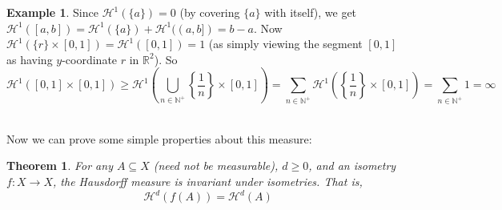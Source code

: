 \documentclass{article}
\theoremstyle{plain}
\newtheorem{thm}{Theorem}[section]
\theoremstyle{definition}
\newtheorem*{ex}{Example}
\theoremstyle{remark}
\begin{document}
\begin{ex}
    Since $\mathcal{H}^1(\{a\}) = 0$ (by covering $\{a\}$ with itself), we get $\mathcal{H}^1([a,b]) = \mathcal{H}^1(\{a\}) + \mathcal{H}^1((a,b])=b-a$. Now  $\mathcal{H}^1(\{r\} \times [0,1]) = \mathcal{H}^1([0,1]) = 1$ (as simply viewing the segment $[0,1]$ as having $y$-coordinate $r$ in $\mathbb{R}^2$). So \[
    \mathcal{H}^1([0,1]\times [0,1]) \ge \mathcal{H}^1\left (\bigcup \limits _{n\in \mathbb{N}^+} \left \{ \frac{1}{n} \right\} \times [0,1] \right) = \sum \limits _{n\in \mathbb{N}^+} \mathcal{H}^1\left ( \left \{ \frac{1}{n} \right\} \times [0,1] \right) = \sum \limits _{n\in \mathbb{N}^+} 1=\infty\]
\end{ex}

~\\Now we can prove some simple properties about this measure: 

\begin{thm}\label{thm:measure_iso}
    For any $A \subseteq X$ (need not be measurable), $d \ge 0$, and an isometry $f: X \to X$, the Hausdorff measure is invariant under isometries. That is, \[
    \mathcal{H}^d(f(A)) = \mathcal{H}^d(A)
    \]
\end{thm}
\end{document}

